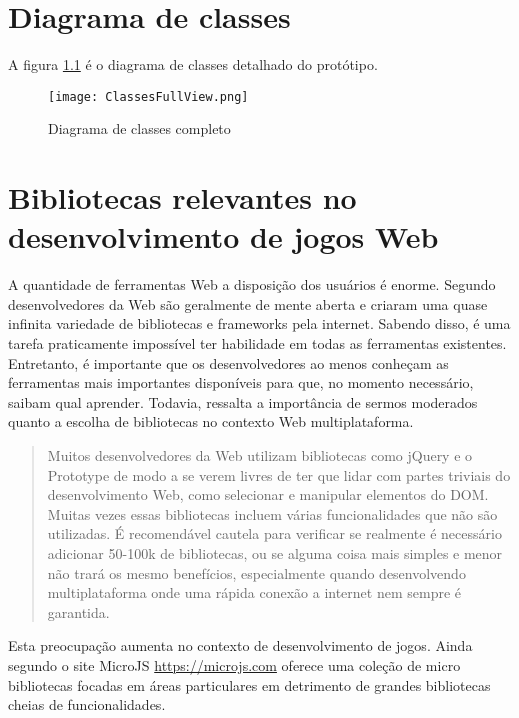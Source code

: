 \chapter{Diagrama de classes}

A figura \ref{fig:fullDiagram} é o diagrama de classes detalhado do protótipo.
\begin{figure}[H]
    \centering
    \texttt{[image: ClassesFullView.png]}
	\caption{Diagrama de classes completo}
    \label{fig:fullDiagram}
\end{figure}

\chapter{Bibliotecas relevantes no desenvolvimento de jogos Web}

A quantidade de ferramentas Web a disposição dos usuários é
enorme. Segundo \citet{html5mostwanted} desenvolvedores da Web são
geralmente de mente aberta e criaram uma quase infinita variedade de
bibliotecas e frameworks pela internet. Sabendo disso, é uma tarefa
praticamente impossível ter habilidade em todas as ferramentas
existentes. Entretanto, é importante que os desenvolvedores ao menos
conheçam as ferramentas mais importantes disponíveis para que, no
momento necessário, saibam qual aprender. Todavia, \citet{creatingFun}
ressalta a importância de sermos moderados quanto a escolha de
bibliotecas no contexto Web multiplataforma.

\begin{quote}
Muitos desenvolvedores da Web utilizam bibliotecas como jQuery e o
Prototype de modo a se verem livres de ter que lidar com
partes triviais do desenvolvimento Web, como selecionar e
manipular elementos do DOM. Muitas vezes essas bibliotecas incluem
várias funcionalidades que não são utilizadas. É recomendável
cautela para verificar se realmente é necessário adicionar 50-100k
de bibliotecas, ou se alguma coisa mais simples e menor não trará
os mesmo benefícios, especialmente quando desenvolvendo
multiplataforma onde uma rápida conexão a internet nem sempre é
garantida.
\end{quote}

Esta preocupação aumenta no contexto de desenvolvimento
de jogos. Ainda segundo \citet{creatingFun} o site MicroJS
\url{https://microjs.com} oferece uma coleção de micro bibliotecas
focadas em áreas particulares em detrimento de grandes bibliotecas
cheias de funcionalidades.

